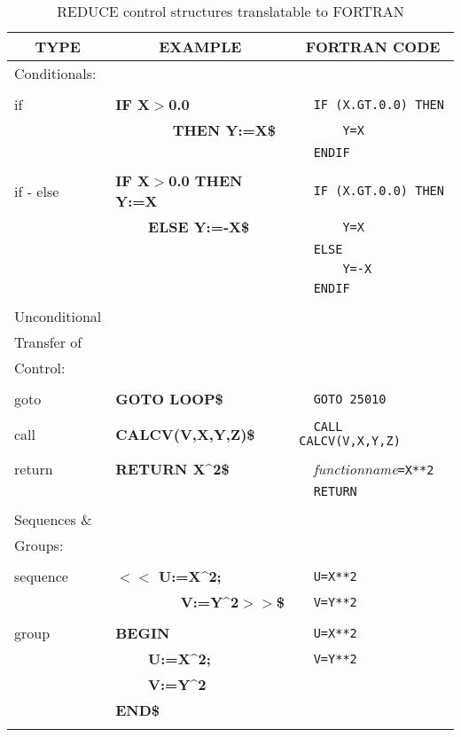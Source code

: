 \begin{table}
\begin{tabular}{||l|l|l||}\hline\hline
\multicolumn{1}{||c|}{\bf TYPE} & \multicolumn{1}{c|}{\bf EXAMPLE}
 & \multicolumn{1}{c||}{\bf FORTRAN CODE} \\ \hline\hline
  Conditionals:&     &\\
&     &\\
    if  &{\bf IF X$>$0.0} &\verb!  IF (X.GT.0.0) THEN!\\
& {\bf \ \ \ \ \ \ \  THEN Y:=X\$} &\verb!      Y=X!\\
& &\verb!  ENDIF!\\
&     &\\
    if - else  &{\bf IF X$>$0.0 THEN Y:=X} &\verb!  IF (X.GT.0.0) THEN!\\
&{\bf\ \ \ \  ELSE Y:=-X\$}&\verb!      Y=X!\\
&     &\verb!  ELSE!\\
&     &\verb!      Y=-X!\\
&     &\verb!  ENDIF!\\
& & \\\hline
  Unconditional&     &\\
  Transfer of  &     &\\
  Control:     &     &\\
&     &\\
    goto&{\bf GOTO LOOP\$} &\verb!  GOTO 25010!\\
&     &\\
    call&{\bf CALCV(V,X,Y,Z)\$} &\verb!  CALL CALCV(V,X,Y,Z)!\\
&     &\\
    return     &{\bf RETURN X\^{}2\$} &\verb!  !{\it
 functionname\/}\verb!=X**2!\\
&     &\verb!  RETURN!\\
& & \\\hline
Sequences \&    &     &\\
Groups: &     &\\
&     &\\
    sequence   &{\bf $<$$<$ U:=X\^{}2;}&\verb!  U=X**2!\\
& {\bf \ \ \ \ \ \ \ \ V:=Y\^{}2$>$$>$\$}    &\verb!  V=Y**2!\\
&     &\\
    group      &{\bf BEGIN}&\verb!  U=X**2!\\
&{\bf\ \ \ \  U:=X\^{}2;}&\verb!  V=Y**2!\\
&{\bf\ \ \ \  V:=Y\^{}2} &\\
&{\bf END\$}&\\
& & \\\hline\hline
\end{tabular}
\caption{REDUCE control structures translatable to FORTRAN}
\end{table}

